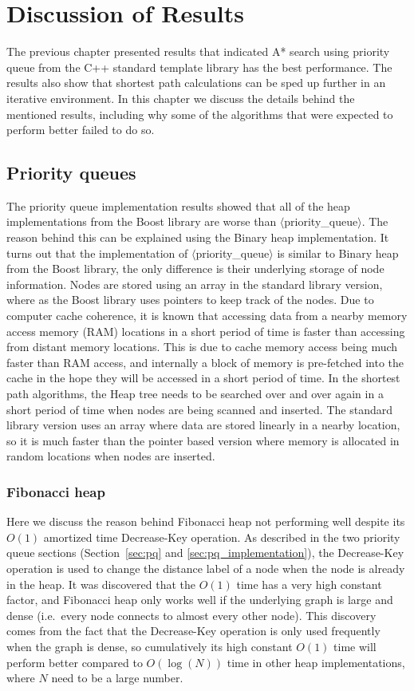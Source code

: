 \chapter{Discussion of Results}
The previous chapter presented results that indicated A* search using priority queue from the C++ standard template library has the best performance.
The results also show that shortest path calculations can be sped up further in an iterative environment.
In this chapter we discuss the details behind the mentioned results,
including why some of the algorithms that were expected to perform better failed to do so.

\section{Priority queues}
The priority queue implementation results showed that
all of the heap implementations from the Boost library are worse than $\langle$priority\_queue$\rangle$.
The reason behind this can be explained using the Binary heap implementation.
It turns out that the implementation of $\langle$priority\_queue$\rangle$ is similar to Binary heap from the Boost library,
the only difference is their underlying storage of node information.
Nodes are stored using an array in the standard library version,
where as the Boost library uses pointers to keep track of 
the nodes.
Due to computer cache coherence,
it is known that accessing data from a nearby memory access memory (RAM) locations in a short period of time is faster than accessing from distant memory locations.
This is due to cache memory access being much faster than RAM access,
and internally a block of memory is pre-fetched into the cache in the hope they will be accessed in a short period of time.
In the shortest path algorithms,
the Heap tree needs to be searched over and over again in a short period of time when nodes are being scanned and inserted.
The standard library version uses an array where data are stored linearly in a nearby location,
so it is much faster than the pointer based version where memory is allocated in random locations when nodes are inserted.

\subsection{Fibonacci heap}
Here we discuss the reason behind Fibonacci heap not performing well despite its $O(1)$ amortized time Decrease-Key operation.
As described in the two priority queue sections (Section~\ref{sec:pq} and \ref{sec:pq_implementation}),
the Decrease-Key operation is used to change the distance label of a node when the node is already in the heap.
It was discovered that the $O(1)$ time has a very high constant factor,
and Fibonacci heap only works well if the underlying graph is large and dense (i.e.\ every node connects to almost every other node).
This discovery comes from the fact that 
the Decrease-Key operation is only used frequently when the graph is dense,
so cumulatively its high constant $O(1)$ time will perform better compared to $O(\log(N))$ time in other heap implementations, where $N$ need to be a large number.

